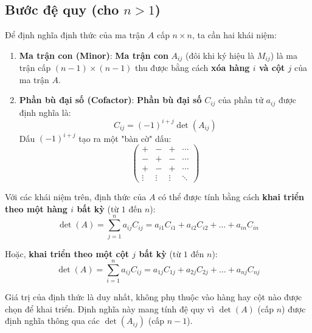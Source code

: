 \subsection*{Bước đệ quy (cho $n > 1$)}
Để định nghĩa định thức của ma trận $A$ cấp $n \times n$, ta cần hai khái niệm:

\begin{enumerate}
    \item \textbf{Ma trận con (Minor)}: \textbf{Ma trận con} $A_{ij}$ (đôi khi ký hiệu là $M_{ij}$) là ma trận cấp $(n-1) \times (n-1)$ thu được bằng cách \textbf{xóa hàng $i$ và cột $j$} của ma trận $A$.
    
    \item \textbf{Phần bù đại số (Cofactor)}: \textbf{Phần bù đại số} $C_{ij}$ của phần tử $a_{ij}$ được định nghĩa là:
    $$ C_{ij} = (-1)^{i+j} \det(A_{ij}) $$
    Dấu $(-1)^{i+j}$ tạo ra một "bàn cờ" dấu:
    $$ \begin{pmatrix}
    + & - & + & \cdots \\
    - & + & - & \cdots \\
    + & - & + & \cdots \\
    \vdots & \vdots & \vdots & \ddots
    \end{pmatrix} $$
\end{enumerate}

Với các khái niệm trên, định thức của $A$ có thể được tính bằng cách \textbf{khai triển theo một hàng $i$ bất kỳ} (từ $1$ đến $n$):
$$ \det(A) = \sum_{j=1}^{n} a_{ij} C_{ij} = a_{i1}C_{i1} + a_{i2}C_{i2} + \dots + a_{in}C_{in} $$

Hoặc, \textbf{khai triển theo một cột $j$ bất kỳ} (từ $1$ đến $n$):
$$ \det(A) = \sum_{i=1}^{n} a_{ij} C_{ij} = a_{1j}C_{1j} + a_{2j}C_{2j} + \dots + a_{nj}C_{nj} $$

Giá trị của định thức là duy nhất, không phụ thuộc vào hàng hay cột nào được chọn để khai triển. Định nghĩa này mang tính đệ quy vì $\det(A)$ (cấp $n$) được định nghĩa thông qua các $\det(A_{ij})$ (cấp $n-1$).

